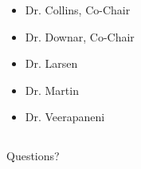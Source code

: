 
\begin{frame}
    
    \begin{itemize}
        \item Dr. Collins, Co-Chair
        \item Dr. Downar, Co-Chair
        \item Dr. Larsen
        \item Dr. Martin
        \item Dr. Veerapaneni
    \end{itemize}
    
\end{frame}


\subsection*{ }
\begin{frame}
    
\vfill
\begin{center}
    \Large Questions?
\end{center}
\vfill

\end{frame}